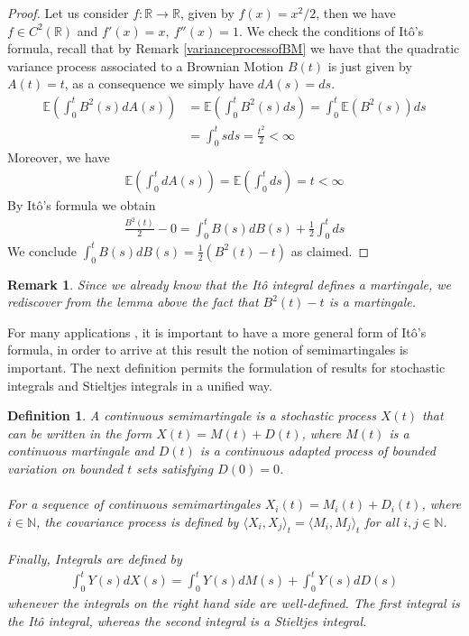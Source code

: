 \documentclass[11pt,a4paper, final]{article}
\newtheorem{defn}{Definition}[section]
\newtheorem{rem}{Remark}[defn]
\begin{document}
\begin{proof}
Let us consider $f: \mathbb{R} \to \mathbb{R}$, given by $f(x) = x^2/2$, then we have $f \in C^2( \mathbb{R})$ and $f'(x)=x, \ f''(x) = 1$. We check the conditions of Itô's formula, recall that by Remark \ref{varianceprocessofBM} we have that the quadratic variance process associated to a Brownian Motion $B(t)$ is just given by $A(t)=t$, as a consequence we simply have $dA(s)=ds$. 
\begin{align*}
\mathbb{E} \left( \int_0^t B^2(s) dA(s) \right) &= \mathbb{E} \left( \int_0^t B^2(s) ds \right) = \int_0^t \mathbb{E}(B^2(s) ) ds \\ &  = \int_0^t s ds = \frac{t^2}{2} < \infty 
\end{align*} 
Moreover, we have
\begin{align*}
\mathbb{E} \left( \int_0^t dA(s) \right) = \mathbb{E}\left( \int_0^t ds \right) = t < \infty 
\end{align*}
By Itô's formula we obtain
\begin{align*}
\frac{B^2(t)}{2}- 0 = \int_0^t B(s) dB(s) + \frac{1}{2} \int_0^t ds 
\end{align*}
We conclude $\displaystyle \int_0^t B(s) dB(s) = \frac{1}{2}(B^2(t)-t)$ as claimed. 
\end{proof}
\begin{rem} Since we already know that the Itô integral defines a martingale, we rediscover from the lemma above the fact that $B^2(t)-t$ is a martingale. 
\end{rem}
\newpage
\noindent For many applications , it is important to have a more general form of Itô's formula, in order to arrive at this result the notion of semimartingales is important. The next definition permits the formulation of results for stochastic integrals and Stieltjes integrals in a unified way. 
\begin{defn} \label{defsemimartingale} A continuous semimartingale is a stochastic process $X(t)$ that can be written in the form $X(t)=M(t) + D(t)$, where $M(t)$ is a continuous martingale and $D(t)$ is a continuous adapted process of bounded variation on bounded $t$ sets satisfying $D(0)=0$. 
\\\\
For a sequence of continuous semimartingales $X_i(t)= M_i(t) + D_i(t)$, where $i \in \mathbb{N}$, the covariance process is defined by $\langle X_i, X_j \rangle_t = \langle M_i, M_j \rangle_t$ for all $i,j \in \mathbb{N}$. 
\\\\
Finally, Integrals are defined by 
\begin{align*}
\int_0^t Y(s) dX(s) = \int_0^t Y(s) dM(s) + \int_0^t Y(s) dD(s) 
\end{align*}
whenever the integrals on the right hand side are well-defined. The first integral is the Itô integral, whereas the second integral is a Stieltjes integral. 
\end{defn}
\end{document}
